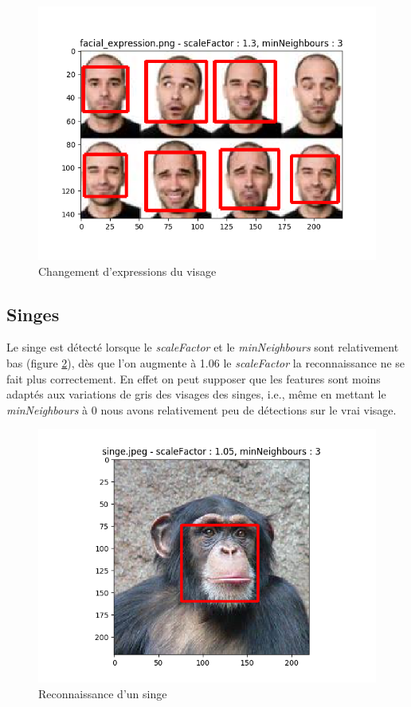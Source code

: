 \documentclass[a4paper,11pt]{article}
\begin{document}
	\begin{figure}[H]
	    \begin{center}
		\includegraphics[scale = 0.6]{images/facial_expression_1,3_3.png}
		\caption{Changement d'expressions du visage}
		\label{fig:visage_exp}
	    \end{center}
	\end{figure}

    
    \subsection{Singes}

	Le singe est détecté lorsque le	\textit{scaleFactor} et le \textit{minNeighbours} sont
	relativement bas (figure \ref{fig:singe}), dès que l'on augmente à 1.06 le
	\textit{scaleFactor} la reconnaissance ne se fait plus correctement.
	En effet on peut supposer que les features sont moins
	adaptés aux variations de gris des visages des singes, i.e., même en mettant le
	\textit{minNeighbours} à 0 nous avons relativement peu de détections sur le vrai visage.

	\begin{figure}[H]
	    \begin{center}
		\includegraphics[scale = 0.6]{images/singe_1,05_3.png}
		\caption{Reconnaissance d'un singe}
		\label{fig:singe}
	    \end{center}
	\end{figure}
\end{document}
